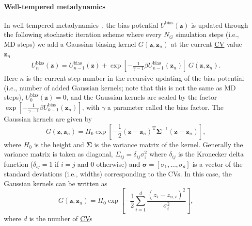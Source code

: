 \documentclass[9pt,review]{livecoms}
\newcommand{\vz}{\mathbf{z}}
\begin{document}
\paragraph{Well-tempered metadynamics}
\label{sec:wtmetad}
In well-tempered metadynamics~\cite{Barducci-PRL-2008}, the bias potential $U^{\mathrm{bias}}(\vz)$ is updated through the following stochastic iteration scheme where every $N_G$ simulation steps (i.e., MD steps) we add a Gaussian biasing kernel $G(\vz,\vz_n)$ at the current \hyperlink{ref:CV} {CV} value $\vz_n$
\begin{align}
\label{wtmetad_update}
U^{\mathrm{bias}}_{n}(\vz) = U^{\mathrm{bias}}_{n-1}(\vz) +
\exp \left[-\frac{1}{\gamma-1} \beta  U^{\mathrm{bias}}_{n-1}(\vz_n)   \right]
\, G(\vz,\vz_{n}).
\end{align}
Here $n$ is the current step number in the recursive updating of the bias potential (i.e., number of added Gaussian kernels; note that this is not the same as MD steps), $U^{\mathrm{bias}}_{0}(\vz)=0$, and the Gaussian kernels are scaled by the factor $\exp \left[-\frac{1}{\gamma-1}
\beta U^{\mathrm{bias}}_{k-1}(\vz_n)   \right]$, with $\gamma$ a parameter called the bias factor. The Gaussian kernels are given by
\begin{equation}
G(\vz,\vz_n)=H_{0}\exp \left[-\frac{1}{2} \left(\vz-\vz_n\right)^{\mathrm{T}}\boldsymbol{\Sigma}^{-1}\left(\vz-\vz_n\right)\right],
\end{equation}
where $H_{0}$ is the height and $\boldsymbol{\Sigma}$ is the variance matrix of the kernel. Generally the variance matrix is taken as diagonal, $\Sigma_{ij}= \delta_{ij} \sigma_{i}^{2}$ where $\delta_{ij}$ is the Kronecker delta function ($\delta_{ij}=1$ if $i=j$ and 0 otherwise) and $\boldsymbol{\sigma}=[\sigma_1,\ldots,\sigma_d]$ is a vector of the standard deviations (i.e., widths) corresponding to the CVs. In this case, the Gaussian kernels can be written as
\begin{equation}
G(\vz,\vz_n)=H_{0} \exp \left[-\frac{1}{2}\sum^{d}_{i=1} \frac{(z_i-z_{n,i})^2}{\sigma^2_i} \right],
\end{equation}
where $d$ is the number of \hyperlink{ref:CV} {CV}s
\end{document}
